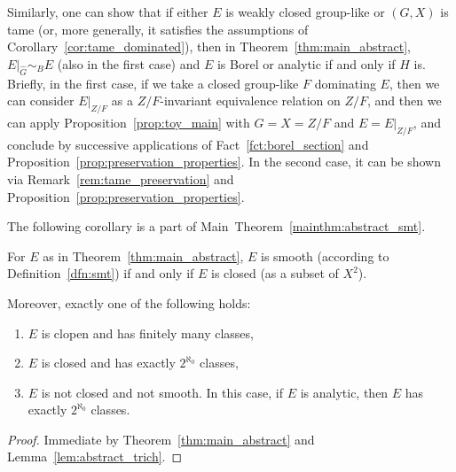 	
	\begin{rem}
		\label{rem:strengthening}
		Similarly, one can show that if either $E$ is weakly closed group-like or $(G,X)$ is tame (or, more generally, it satisfies the assumptions of Corollary~\ref{cor:tame_dominated}), then in Theorem~\ref{thm:main_abstract}, $E|_{\hat G}\sim_B E$ (also in the first case) and $E$ is Borel or analytic if and only if $H$ is. Briefly, in the first case, if we take a closed group-like $F$ dominating $E$, then we can consider $E|_{Z/F}$ as a $Z/F$-invariant equivalence relation on $Z/F$, and then we can apply Proposition~\ref{prop:toy_main} with $G=X=Z/F$ and $E=E|_{Z/F}$, and conclude by successive applications of Fact~\ref{fct:borel_section} and Proposition~\ref{prop:preservation_properties}. In the second case, it can be shown via Remark~\ref{rem:tame_preservation} and Proposition~\ref{prop:preservation_properties}. \xqed{\lozenge}
	\end{rem}
	The following corollary is a part of Main~Theorem~\ref{mainthm:abstract_smt}.
	\begin{cor}
		\label{cor:metr_smt_cls}
		For $E$ as in Theorem~\ref{thm:main_abstract}, $E$ is smooth (according to Definition~\ref{dfn:smt}) if and only if $E$ is closed (as a subset of $X^2$).
		
		Moreover, exactly one of the following holds:
		\begin{enumerate}
			\item
			$E$ is clopen and has finitely many classes,
			\item
			$E$ is closed and has exactly $2^{\aleph_0}$ classes,
			\item
			$E$ is not closed and not smooth. In this case, if $E$ is analytic, then $E$ has exactly $2^{\aleph_0}$ classes.
		\end{enumerate}
	\end{cor}
	\begin{proof}
		Immediate by Theorem~\ref{thm:main_abstract} and Lemma~\ref{lem:abstract_trich}.
	\end{proof}
	
	
	
	
	
